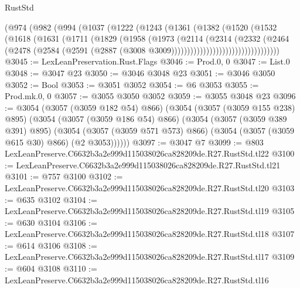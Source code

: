 \begin{lexlean}{RustStd}
\begin{coremodule}
                      (@974
                        (@982
                          (@994
                            (@1037
                              (@1222
                                (@1243
                                  (@1361
                                    (@1382
                                      (@1520
                                        (@1532
                                          (@1618
                                            (@1631
                                              (@1711
                                                (@1829
                                                  (@1958
                                                    (@1973
                                                      (@2114
                                                        (@2314
                                                          (@2332
                                                            (@2464
                                                              (@2478
                                                                (@2584
                                                                  (@2591
                                                                    (@2887
                                                                      (@3008
                                                                        @3009))))))))))))))))))))))))))))))))))
@3045 := LexLeanPreservation.Rust.Flags
@3046 := Prod.{0, 0}
@3047 := List.{0}
@3048 := @3047 @23
@3050 := @3046 @3048 @23
@3051 := @3046 @3050
@3052 := Bool
@3053 := @3051 @3052
@3054 := @6 @3053
@3055 := Prod.mk.{0, 0}
@3057 := @3055 @3050 @3052
@3059 := @3055 @3048 @23
@3096 := @3054
    (@3057 (@3059 @182 @54) @866)
    (@3054
      (@3057 (@3059 @155 @238) @895)
      (@3054
        (@3057 (@3059 @186 @54) @866)
        (@3054
          (@3057 (@3059 @389 @391) @895)
          (@3054 (@3057 (@3059 @571 @573) @866) (@3054 (@3057 (@3059 @615 @30) @866) (@2 @3053))))))
@3097 := @3047 @7
@3099 := @803 LexLeanPreserve.C6632b3a2e999d115038026ca828209de.R27.RustStd.tl22
@3100 := LexLeanPreserve.C6632b3a2e999d115038026ca828209de.R27.RustStd.tl21
@3101 := @757 @3100
@3102 := LexLeanPreserve.C6632b3a2e999d115038026ca828209de.R27.RustStd.tl20
@3103 := @635 @3102
@3104 := LexLeanPreserve.C6632b3a2e999d115038026ca828209de.R27.RustStd.tl19
@3105 := @630 @3104
@3106 := LexLeanPreserve.C6632b3a2e999d115038026ca828209de.R27.RustStd.tl18
@3107 := @614 @3106
@3108 := LexLeanPreserve.C6632b3a2e999d115038026ca828209de.R27.RustStd.tl17
@3109 := @604 @3108
@3110 := LexLeanPreserve.C6632b3a2e999d115038026ca828209de.R27.RustStd.tl16

\end{coremodule}
\end{lexlean}
